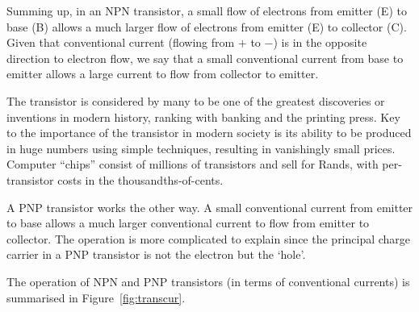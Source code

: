 Summing up, in an NPN transistor, a small flow of electrons from emitter (E) to base (B) allows a much larger flow of electrons from emitter (E) to collector (C).  Given that conventional current (flowing from $+$ to $-$) is in the opposite direction to electron flow, we say that a small conventional current from base to emitter allows a large current to flow from collector to emitter.
\begin{IFact}{The transistor is considered by many to be one of the
    greatest discoveries or inventions in modern history, ranking with
    banking and the printing press. Key to the importance of the
    transistor in modern society is its ability to be produced in huge
    numbers using simple techniques, resulting in vanishingly small
    prices. Computer ``chips'' consist of millions of transistors and
    sell for Rands, with per-transistor costs in the
    thousandths-of-cents.
}\end{IFact} 
A PNP transistor works the other way.  A small conventional current from emitter to base allows a much larger conventional current to flow from emitter to collector.  The operation is more complicated to explain since the principal charge carrier in a PNP transistor is not the electron but the `hole'.

The operation of NPN and PNP transistors (in terms of conventional currents) is summarised in Figure~\ref{fig:transcur}.

